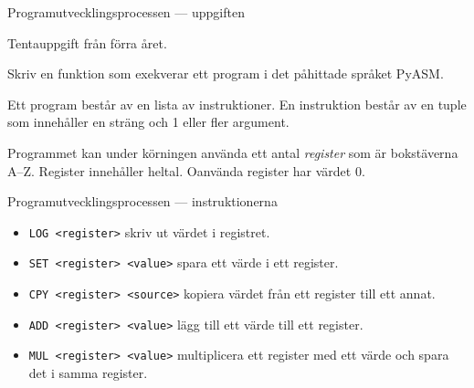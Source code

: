 \documentclass{beamer}
\begin{document}
  \begin{frame}{Programutvecklingsprocessen --- uppgiften}

    Tentauppgift från förra året.

    \pause{}

    Skriv en funktion som exekverar ett program i det påhittade språket PyASM.

    Ett program består av en lista av instruktioner. En instruktion består av en
    tuple som innehåller en sträng och 1 eller fler argument.

    Programmet kan under körningen använda ett antal \emph{register} som är
    bokstäverna A--Z. Register innehåller heltal. Oanvända register har värdet
    0.

  \end{frame}

  \begin{frame}{Programutvecklingsprocessen --- instruktionerna}

    \begin{itemize}
      \item \texttt{LOG <register>} skriv ut värdet i registret.
      \item \texttt{SET <register> <value>} spara ett värde i ett register.
      \item \texttt{CPY <register> <source>} kopiera värdet från ett register till ett annat.
      \item \texttt{ADD <register> <value>} lägg till ett värde till ett register.
      \item \texttt{MUL <register> <value>} multiplicera ett register med ett värde och spara det i samma register.
    \end{itemize}

  \end{frame}
\end{document}
